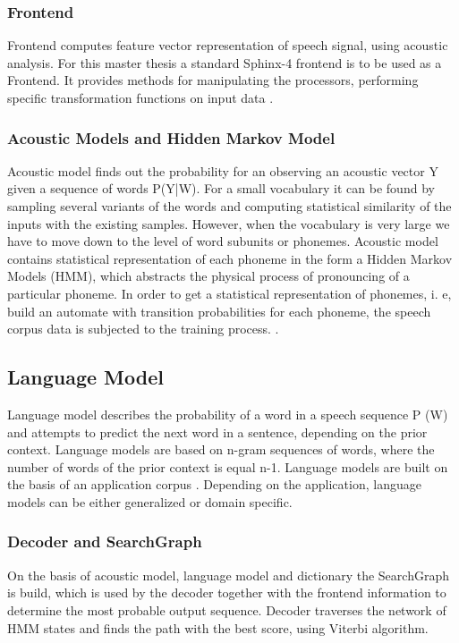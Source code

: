 \subsubsection {Frontend}
Frontend computes feature vector representation of speech signal, using acoustic
analysis. For this master thesis a standard Sphinx-4 frontend is to be used as a
Frontend. It provides methods for manipulating the processors, performing
specific transformation functions on input data \parencite{Lamereetal2013:Eurospeech}.
\subsubsection {Acoustic Models and Hidden Markov Model}
Acoustic model finds out the probability for an observing an acoustic vector Y
given a sequence of words P(Y|W). For a small vocabulary it can be found by
sampling several variants of the words and computing statistical similarity of the inputs with the existing
samples. However, when the vocabulary is very large we have to move down to the level of word
subunits or phonemes.
Acoustic model contains statistical representation of each phoneme in the form a Hidden
Markov Models (HMM), which abstracts the physical process of pronouncing of a
particular phoneme. In order to get
a statistical representation of phonemes, i. e, build an automate with
transition probabilities for each phoneme, the speech corpus data is subjected
to the training process.
\parencite {jurafskymartin2009}.
\subsection {Language Model}
Language model describes the probability of a word in a speech sequence P (W)
and attempts to predict the next word in a sentence, depending on the prior context.
Language models are based on n-gram sequences of words, where the number of words of
the prior context is equal n-1. Language models are built on the basis of an
application corpus \parencite {jurafskymartin2009}. Depending on the
application, language models can be either generalized or domain specific. 
\subsubsection {Decoder and SearchGraph}
On the basis of acoustic model, language model and dictionary the SearchGraph
is build, which is used by the decoder together with the frontend information
to determine the most probable output sequence. Decoder
traverses the network of HMM states and finds the path with the best
score, using Viterbi algorithm. 
